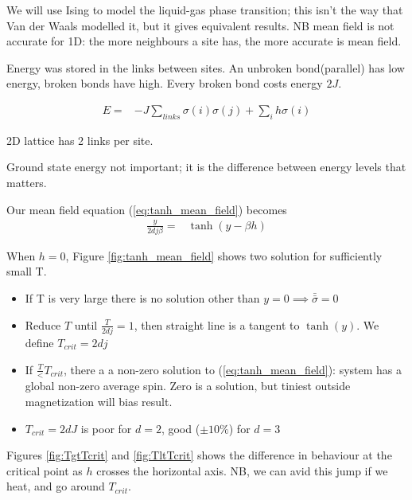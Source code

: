 \documentclass[]{article}
\begin{document}
We will use  Ising to model the liquid-gas phase transition; this isn't the way that Van der Waals modelled it, but it gives equivalent results. NB mean field is not accurate for 1D: the more neighbours a site has, the more accurate is mean field. 

Energy was stored in the links between sites. An unbroken bond(parallel) has low energy, broken bonds have high. Every broken bond costs energy $2J$.

\begin{align*}
E =& -J \sum_{links} \sigma(i) \sigma(j) + \sum_{i}h\sigma(i)
\end{align*}

2D lattice has 2 links per site.

Ground state energy not important; it is the difference between energy levels that matters.

Our mean field equation (\ref{eq:tanh_mean_field}) becomes
\begin{align*}
\frac{ y}{2 d j \beta} =& \tanh(y - \beta h)
\end{align*}

When $h=0$, Figure \ref{fig:tanh_mean_field} shows two solution for sufficiently small T.

\begin{itemize}
	\item If T is very large there is no solution other than $y=0\implies\bar{\bar{\sigma}}=0$
	\item Reduce $T$ until $\frac{T}{2 d j}= 1$, then straight line is a tangent to $\tanh(y)$. We define $T_{crit}= 2 d j$
	\item If $\frac{T}<T_{crit}$, there a a non-zero solution to (\ref{eq:tanh_mean_field}): system has a global non-zero average spin. Zero is a solution, but tiniest outside magnetization will bias result.
	\item $T_{crit} = 2 d J$ is poor for $d=2$, good ($\pm10\%$) for $d=3$
\end{itemize}

Figures \ref{fig:TgtTcrit} and \ref{fig:TltTcrit} shows the difference in behaviour at the critical point as $h$ crosses the horizontal axis. NB, we can avid this jump if we heat, and go around $T_{crit}$.
\end{document}
